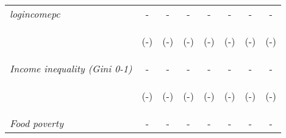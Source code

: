 \begin{tabular}{lccccccc}
\textit{logincomepc}          		  &  -    &    -   &     -  &  -  &     -  & -   &  -    \\

\vspace{4pt} & \begin{footnotesize}(-)\end{footnotesize} &  \begin{footnotesize}(-)\end{footnotesize}  &  \begin{footnotesize}(-)\end{footnotesize}    &   \begin{footnotesize}(-)\end{footnotesize}   &   \begin{footnotesize}(-)\end{footnotesize}  &  \begin{footnotesize}(-)\end{footnotesize} &  \begin{footnotesize}(-)\end{footnotesize} \\



\textit{Income inequality (Gini 0-1)}          		  &  -    &    -   &     -  &  -  &     -  & -    &  -   \\

\vspace{4pt} & \begin{footnotesize}(-)\end{footnotesize} &  \begin{footnotesize}(-)\end{footnotesize}  &  \begin{footnotesize}(-)\end{footnotesize}    &   \begin{footnotesize}(-)\end{footnotesize}   &   \begin{footnotesize}(-)\end{footnotesize}  &  \begin{footnotesize}(-)\end{footnotesize} &  \begin{footnotesize}(-)\end{footnotesize} \\



\textit{Food poverty}          		  &  -    &    -   &     -  &  -  &     -  & -   &  -    \\


\end{tabular}
